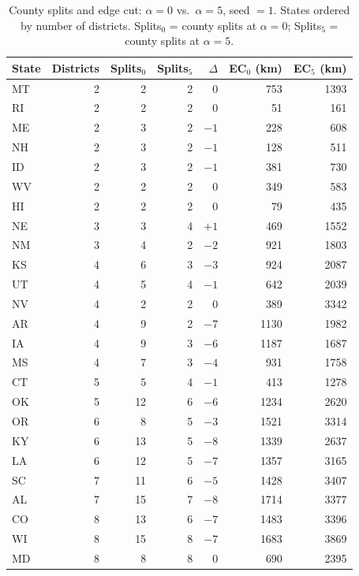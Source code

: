 \begin{table}[t]
\centering
\caption{County splits and edge cut: $\alpha = 0$ vs.\ $\alpha = 5$, seed $= 1$.
States ordered by number of districts. Splits$_0$ = county splits at $\alpha=0$;
Splits$_5$ = county splits at $\alpha=5$.}
\label{tab:splits}
\small
\begin{tabular}{lrrrrrr}
\toprule
State & Districts & Splits$_0$ & Splits$_5$ & $\Delta$ & EC$_0$ (km) & EC$_5$ (km) \\
\midrule
MT  & 2  & 2  & 2  & 0    & 753   & 1393  \\
RI  & 2  & 2  & 2  & 0    & 51    & 161   \\
ME  & 2  & 3  & 2  & $-1$ & 228   & 608   \\
NH  & 2  & 3  & 2  & $-1$ & 128   & 511   \\
ID  & 2  & 3  & 2  & $-1$ & 381   & 730   \\
WV  & 2  & 2  & 2  & 0    & 349   & 583   \\
HI  & 2  & 2  & 2  & 0    & 79    & 435   \\
NE  & 3  & 3  & 4  & $+1$ & 469   & 1552  \\
NM  & 3  & 4  & 2  & $-2$ & 921   & 1803  \\
KS  & 4  & 6  & 3  & $-3$ & 924   & 2087  \\
UT  & 4  & 5  & 4  & $-1$ & 642   & 2039  \\
NV  & 4  & 2  & 2  & 0    & 389   & 3342  \\
AR  & 4  & 9  & 2  & $-7$ & 1130  & 1982  \\
IA  & 4  & 9  & 3  & $-6$ & 1187  & 1687  \\
MS  & 4  & 7  & 3  & $-4$ & 931   & 1758  \\
CT  & 5  & 5  & 4  & $-1$ & 413   & 1278  \\
OK  & 5  & 12 & 6  & $-6$ & 1234  & 2620  \\
OR  & 6  & 8  & 5  & $-3$ & 1521  & 3314  \\
KY  & 6  & 13 & 5  & $-8$ & 1339  & 2637  \\
LA  & 6  & 12 & 5  & $-7$ & 1357  & 3165  \\
SC  & 7  & 11 & 6  & $-5$ & 1428  & 3407  \\
AL  & 7  & 15 & 7  & $-8$ & 1714  & 3377  \\
CO  & 8  & 13 & 6  & $-7$ & 1483  & 3396  \\
WI  & 8  & 15 & 8  & $-7$ & 1683  & 3869  \\
MD  & 8  & 8  & 8  & 0    & 690   & 2395  \\

\end{tabular}
\end{table}
